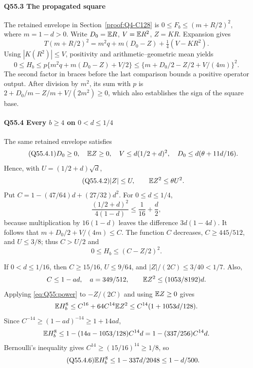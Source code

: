 \paragraph{Q55.3 The propagated square}\label{part:Q55.3}
The retained envelope in Section~\ref{proof:Q4-C128} is
$0\le\allowbreak  F_b\le\allowbreak (m+R/2)^2$, where $m=\allowbreak 1-d>\allowbreak 0$. Write
$D_0=\allowbreak \mathbb E R$, $V=\allowbreak \mathbb E R^2$, $Z=\allowbreak KR$. Expansion gives
\[
 T(m+R/2)^2=m^2q+m(D_0-Z)+\tfrac14(V-KR^2).
\]
Using $|K(R^2)|\le\allowbreak  V$, positivity and arithmetic--geometric mean yields
\begin{equation}\tag{Q55.3.1}\label{eq:Q55:square}
 0\le H_b\le p\{m^2q+m(D_0-Z)+V/2\}
 \le\{m+D_0/2-Z/2+V/(4m)\}^2.
\end{equation}
The second factor in braces before the last comparison bounds a positive
operator output. After division by $m^2$, its sum with $p$ is
$2+D_0/m-Z/m+V/(2m^2)\ge\allowbreak 0$, which also establishes the sign of the
square base.

\paragraph{Q55.4 Every $b\ge\allowbreak 4$ on $0<\allowbreak d\le\allowbreak 1/4$}\label{part:Q55.4}
The same retained envelope satisfies
\begin{equation}\tag{Q55.4.1}\label{eq:Q55:data}
 D_0\ge0,\quad \mathbb E Z\ge0,\quad
 V\le d(1/2+d)^2,\quad D_0\le d(\theta+11d/16).
\end{equation}
Hence, with $U=\allowbreak (1/2+d)\sqrt d$,
\begin{equation}\tag{Q55.4.2}\label{eq:Q55:row}
 |Z|\le U,\qquad \mathbb E Z^2\le\theta U^2.
\end{equation}
Put $C=\allowbreak 1-(47/64)d+(27/32)d^2$. For $0\le\allowbreak  d\le\allowbreak 1/4$,
\begin{equation}\tag{Q55.4.4}\label{eq:Q55:chord}
 \frac{(1/2+d)^2}{4(1-d)}\le\frac1{16}+\frac d2,
\end{equation}
because multiplication by $16(1-d)$ leaves the difference $3d(1-4d)$.
It follows that $m+D_0/2+V/(4m)\le\allowbreak  C$.
The function $C$ decreases, $C\ge\allowbreak 445/512$, and $U\le\allowbreak 3/8$; thus $C>\allowbreak U/2$ and
\begin{equation}\tag{Q55.4.5}\label{eq:Q55:majorant}
 0\le H_b\le(C-Z/2)^2.
\end{equation}

If $0<\allowbreak d\le\allowbreak 1/16$, then $C\ge\allowbreak 15/16$, $U\le\allowbreak 9/64$, and
$|Z|/(2C)\le\allowbreak 3/40<\allowbreak 1/7$. Also,
\[
 C\le1-ad,\quad a=349/512,\qquad
 \mathbb E Z^2\le(1053/8192)d.
\]
Applying \eqref{eq:Q55:power} to $-Z/(2C)$ and using $\mathbb E Z\ge\allowbreak 0$ gives
\[
 \mathbb E H_b^8\le C^{16}+64C^{14}\mathbb E Z^2
 \le C^{14}(1+1053d/128).
\]
Since $C^{-14}\ge\allowbreak (1-ad)^{-14}\ge\allowbreak 1+14ad$,
\[
 \mathbb E H_b^8\le1-(14a-1053/128)C^{14}d
 =1-(337/256)C^{14}d.
\]
Bernoulli's inequality gives $C^{14}\ge\allowbreak (15/16)^{14}\ge\allowbreak 1/8$, so
\begin{equation}\tag{Q55.4.6}\label{eq:Q55:small}
 \mathbb E H_b^8\le1-337d/2048\le1-d/500.
\end{equation}

